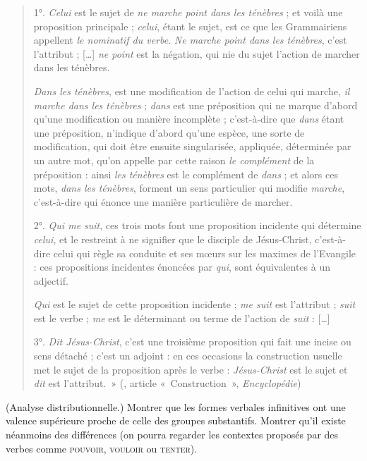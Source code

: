 {\begin{quote}
    1°. \textit{Celui} est le sujet de \textit{ne marche point dans les ténèbres} ; et voilà une proposition principale ; \textit{celui}, étant le sujet, est ce que les Grammairiens appellent \textit{le nominatif du verbe}. \textit{Ne marche point dans les ténèbres}, c’est l’attribut ; […] \textit{ne point} est la négation, qui nie du sujet l’action de marcher dans les ténèbres.

    \textit{Dans les ténèbres}, est une modification de l’action de celui qui marche, \textit{il marche dans les ténèbres} ; \textit{dans} est une préposition qui ne marque d’abord qu’une modification ou manière incomplète ; c’est-à-dire que \textit{dans} étant une préposition, n’indique d’abord qu’une espèce, une sorte de modification, qui doit être ensuite singularisée, appliquée, déterminée par un autre mot, qu’on appelle par cette raison \textit{le complément} de la préposition : ainsi \textit{les ténèbres} est le complément de \textit{dans} ; et alors ces mots, \textit{dans les ténèbres}, forment un sens particulier qui modifie \textit{marche}, c’est-à-dire qui énonce une manière particulière de marcher.

    2°. \textit{Qui me suit}, ces trois mots font une proposition incidente qui détermine \textit{celui}, et le restreint à ne signifier que le disciple de Jésus-Christ, c’est-à-dire celui qui règle sa conduite et ses mœurs sur les maximes de l’Evangile : ces propositions incidentes énoncées par \textit{qui}, sont équivalentes à un adjectif.

    \textit{Qui} est le sujet de cette proposition incidente ; \textit{me suit} est l’attribut ; \textit{suit} est le verbe ; \textit{me} est le dé​​terminant ou terme de l’action de \textit{suit} : […]

    3°. \textit{Dit Jésus-Christ}, c’est une troisième proposition qui fait une incise ou sens détaché ; c’est un adjoint : en ces occasions la construction usuelle met le sujet de la proposition après le verbe : \textit{Jésus-Christ} est le sujet et \textit{dit} est l’attribut.~» (\citealt{Dumarsais1754}, article «~Construction~», \textit{Encyclopédie})
    \end{quote}

     ({Analyse distributionnelle.}) Montrer que les formes verbales infinitives ont une valence supérieure proche de celle des groupes substantifs. Montrer qu’il existe néanmoins des différences (on pourra regarder les contextes proposés par des verbes comme \textsc{pouvoir}, \textsc{vouloir}  ou \textsc{tenter).}

}
